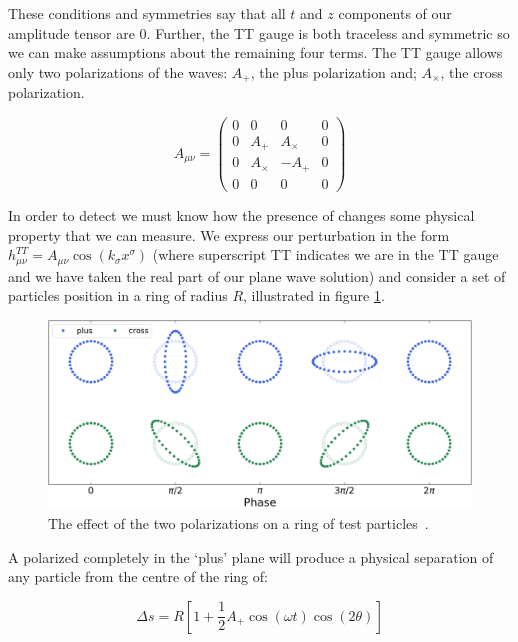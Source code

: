 These conditions and symmetries say that all $t$ and $z$ components of our amplitude tensor are 0. Further, the TT gauge is both traceless and symmetric so we can make assumptions about the remaining four terms. The TT gauge allows
only two polarizations of the waves: $A_{+}$, the plus polarization and; $A_{\times}$, the cross polarization.

\begin{equation}
   A_{\mu \nu} =
   \begin{pmatrix}
      0 & 0 & 0 & 0 \\
      0 & A_+ & A_\times & 0 \\
      0 & A_\times & -A_+ & 0 \\
      0 & 0 & 0 & 0
   \end{pmatrix}
   \label{eqn:A_mu_nu}
\end{equation}

In order to detect \gws we must know how the presence of \gws changes some physical property that we can measure. We express our perturbation in the form $h_{\mu \nu}^{TT} = A_{\mu \nu} \cos(k_\sigma x^\sigma)$ (where superscript TT
indicates we are in the TT gauge and we have taken the real part of our plane wave solution) and consider a set of particles position in a ring of radius $R$, illustrated in figure \ref{fig:polarization}.

\begin{figure}
   \includegraphics[width=\textwidth]{images/1_general_relativity/polarization.png}
   \caption{\label{fig:polarization}The effect of the two polarizations on a ring of test particles~\cite{gw_polarization_plots}.}
\end{figure}

A \gw polarized completely in the `plus' plane will produce a physical separation of any particle from the centre of the ring of:

\begin{equation}
   \Delta s = R[1 + \frac{1}{2} A_+ \cos(\omega t) \cos(2 \theta)]
   \label{eqn:plus_separation}
\end{equation}


